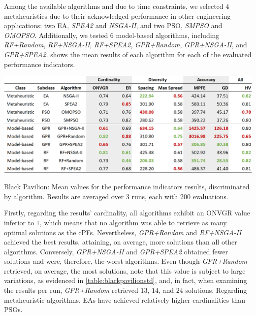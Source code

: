 Among the available algorithms and due to time constraints, we selected $4$ metaheuristics due to their acknowledged performance in other engineering applications: two \ac{EA}, \textit{SPEA2} and \textit{NSGA-II}, and two \ac{PSO}, \textit{SMPSO} and \textit{OMOPSO}. Additionally, we tested $6$ model-based algorithms, including \textit{RF+Random}, \textit{RF+NSGA-II}, \textit{RF+SPEA2}, \textit{GPR+Random}, \textit{GPR+NSGA-II}, and \textit{GPR+SPEA2}.  shows the mean results of each algorithm for each of the evaluated performance indicators. 

\begin{table}[]
	\centering
	\includegraphics[width=\textwidth]{Images/Evaluation/BlackPavilion/Results_Mean_20190428.PNG}
	\caption[Black Pavilion: Mean values for the performance indicators results, discriminated by algorithm]{Black Pavilion: Mean values for the performance indicators results, discriminated by algorithm. Results are averaged over $3$ runs, each with $200$ evaluations.}
	\label{table:blackpavilion}
\end{table}

Firstly, regarding the results' cardinality, all algorithms exhibit an \ac{ONVGR} value inferior to $1$, which means that no algorithm was able to retrieve as many optimal solutions as the \acp{cPF}. Nevertheless, \textit{GPR+Random} and \textit{RF+NSGA-II} achieved the best results, attaining, on average, more solutions than all other algorithms. Conversely, \textit{GPR+NSGA-II} and \textit{GPR+SPEA2} obtained fewer solutions and were, therefore, the worst algorithms. Even though \textit{GPR+Random} retrieved, on average, the most solutions, note that this value is subject to large variations, as evidenced in \cref{table:blackpavilionstd}, and, in fact, when examining the results per run, \textit{GPR+Random} retrieved $13$, $14$, and $24$ solutions. Regarding metaheuristic algorithms, \acp{EA} have achieved relatively higher cardinalities than \acp{PSO}. 

